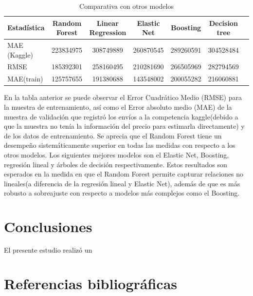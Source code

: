 \documentclass[
  11pt,
  letterpaper,
]{article}
\begin{document}
\begin{table}[ht]
\centering
\caption{Comparativa con otros modelos}
\begin{tabular}{lcccccr}
\hline \hline
Estadística & Random Forest &  Linear Regression & Elastic Net & Boosting & Decision tree \\
\hline
MAE (Kaggle) & 223834975 & 308749889 & 260870545 & 289260591 & 304528484  \\
RMSE & 185392301 & 258160495 & 210281690 & 266505969 & 282794569 \\
MAE(train) & 125757655 & 191380688 & 143548002 & 200055282 & 216060881 \\
\hline
\end{tabular}
\end{table}

En la tabla anterior se puede observar el Error Cuadrático Medio (RMSE) para la muestra de entrenamiento, así como el Error absoluto medio (MAE) de la muestra de validación que registró los envíos a la competencia kaggle(debido a que la muestra no tenía la información del precio para estimarla directamente) y de los datos de entrenamiento. Se aprecia que el Random Forest tiene un desempeño sistemáticamente superior en todas las medidas con respecto a los otros modelos. Los siguientes mejores modelos son el Elastic Net, Boosting, regresión lineal y árboles de decisión respectivamente. Estos resultados son esperados en la medida en que el Random Forest permite capturar relaciones no lineales(a diferencia de la regresión lineal y Elastic Net), además de que es más robusto a sobreajuste con respecto a modelos más complejos como el Boosting.

\hypertarget{conclusiones}{%
\section{Conclusiones}\label{conclusiones}}

El presente estudio realizó un

\hypertarget{referencias-bibliogruxe1ficas}{%
\section{Referencias bibliográficas}\label{referencias-bibliogruxe1ficas}}
\end{document}
